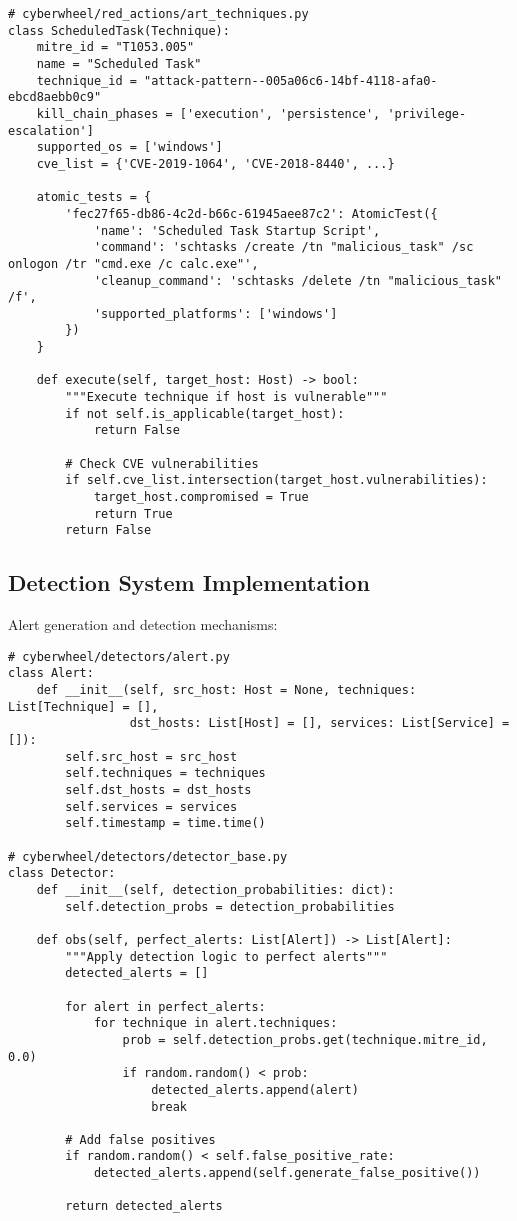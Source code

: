 \documentclass[12pt,a4paper]{article}
\begin{document}
\begin{lstlisting}[caption=MITRE ATT&CK Technique Implementation]
# cyberwheel/red_actions/art_techniques.py
class ScheduledTask(Technique):
    mitre_id = "T1053.005"
    name = "Scheduled Task"
    technique_id = "attack-pattern--005a06c6-14bf-4118-afa0-ebcd8aebb0c9"
    kill_chain_phases = ['execution', 'persistence', 'privilege-escalation']
    supported_os = ['windows']
    cve_list = {'CVE-2019-1064', 'CVE-2018-8440', ...}
    
    atomic_tests = {
        'fec27f65-db86-4c2d-b66c-61945aee87c2': AtomicTest({
            'name': 'Scheduled Task Startup Script',
            'command': 'schtasks /create /tn "malicious_task" /sc onlogon /tr "cmd.exe /c calc.exe"',
            'cleanup_command': 'schtasks /delete /tn "malicious_task" /f',
            'supported_platforms': ['windows']
        })
    }
    
    def execute(self, target_host: Host) -> bool:
        """Execute technique if host is vulnerable"""
        if not self.is_applicable(target_host):
            return False
            
        # Check CVE vulnerabilities
        if self.cve_list.intersection(target_host.vulnerabilities):
            target_host.compromised = True
            return True
        return False
\end{lstlisting}

\subsection{Detection System Implementation}
Alert generation and detection mechanisms:

\begin{lstlisting}[caption=Alert and Detection Implementation]
# cyberwheel/detectors/alert.py
class Alert:
    def __init__(self, src_host: Host = None, techniques: List[Technique] = [],
                 dst_hosts: List[Host] = [], services: List[Service] = []):
        self.src_host = src_host
        self.techniques = techniques
        self.dst_hosts = dst_hosts
        self.services = services
        self.timestamp = time.time()

# cyberwheel/detectors/detector_base.py
class Detector:
    def __init__(self, detection_probabilities: dict):
        self.detection_probs = detection_probabilities
        
    def obs(self, perfect_alerts: List[Alert]) -> List[Alert]:
        """Apply detection logic to perfect alerts"""
        detected_alerts = []
        
        for alert in perfect_alerts:
            for technique in alert.techniques:
                prob = self.detection_probs.get(technique.mitre_id, 0.0)
                if random.random() < prob:
                    detected_alerts.append(alert)
                    break
                    
        # Add false positives
        if random.random() < self.false_positive_rate:
            detected_alerts.append(self.generate_false_positive())
            
        return detected_alerts
\end{lstlisting}
\end{document}
